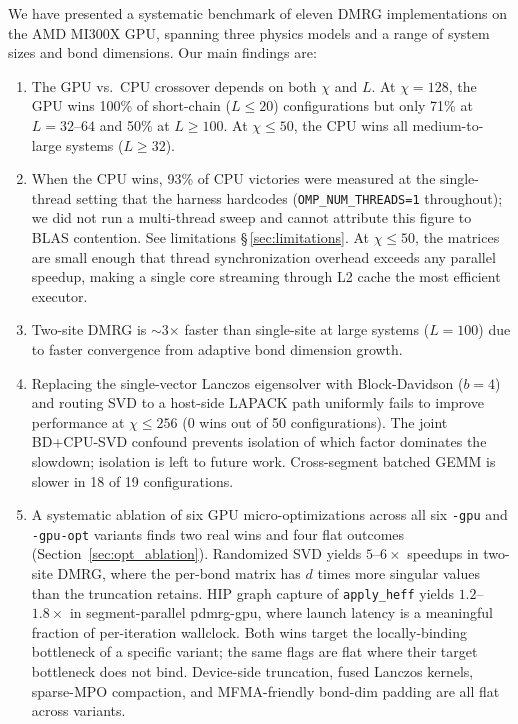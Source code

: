 \documentclass[preprint,12pt]{elsarticle}
\begin{document}
We have presented a systematic benchmark of eleven DMRG implementations on the AMD MI300X GPU, spanning three physics models and a range of system sizes and bond dimensions.
Our main findings are:

\begin{enumerate}
  \item The GPU vs.\ CPU crossover depends on both $\chi$ and $L$.
  At $\chi = 128$, the GPU wins 100\% of short-chain ($L \leq 20$) configurations but only 71\% at $L = 32$--$64$ and 50\% at $L \geq 100$.
  At $\chi \leq 50$, the CPU wins all medium-to-large systems ($L \geq 32$).

  \item When the CPU wins, 93\% of CPU victories were measured at the single-thread setting that the harness hardcodes (\texttt{OMP\_NUM\_THREADS=1} throughout); we did not run a multi-thread sweep and cannot attribute this figure to BLAS contention. See limitations \S\,\ref{sec:limitations}.
  At $\chi \leq 50$, the matrices are small enough that thread synchronization overhead exceeds any parallel speedup, making a single core streaming through L2 cache the most efficient executor.

  \item Two-site DMRG is $\sim$3$\times$ faster than single-site at large systems ($L = 100$) due to faster convergence from adaptive bond dimension growth.

  \item Replacing the single-vector Lanczos eigensolver with Block-Davidson ($b{=}4$) and routing SVD to a host-side LAPACK path uniformly fails to improve performance at $\chi \leq 256$ (0 wins out of 50 configurations).
  The joint BD+CPU-SVD confound prevents isolation of which factor dominates the slowdown; isolation is left to future work.
  Cross-segment batched GEMM is slower in 18 of 19 configurations.

  \item A systematic ablation of six GPU micro-optimizations across all six \texttt{-gpu} and \texttt{-gpu-opt} variants finds two real wins and four flat outcomes (Section~\ref{sec:opt_ablation}).
  Randomized SVD yields $5$--$6\times$ speedups in two-site DMRG, where the per-bond matrix has $d$ times more singular values than the truncation retains.
  HIP graph capture of \texttt{apply\_heff} yields $1.2$--$1.8\times$ in segment-parallel pdmrg-gpu, where launch latency is a meaningful fraction of per-iteration wallclock.
  Both wins target the locally-binding bottleneck of a specific variant; the same flags are flat where their target bottleneck does not bind.
  Device-side truncation, fused Lanczos kernels, sparse-MPO compaction, and MFMA-friendly bond-dim padding are all flat across variants.


\end{enumerate}
\end{document}
